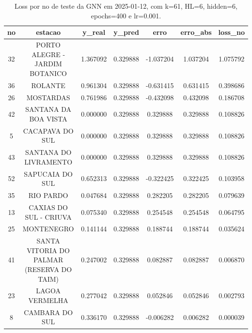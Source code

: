 \begin{table}[h]
\centering
\caption{Loss por no de teste da GNN em 2025-01-12, com k=61, HL=6, hidden=6, epochs=400 e lr=0.001.}
\label{tab:gnn_loss_k61_hl6_h6_e400_d20250112}
\begin{tabular}{ccccccc}
\toprule
no & estacao & y\_real & y\_pred & erro & erro\_abs & loss\_no \\
\midrule
32 & PORTO ALEGRE - JARDIM BOTANICO & 1.367092 & 0.329888 & -1.037204 & 1.037204 & 1.075792 \\
36 & ROLANTE & 0.961304 & 0.329888 & -0.631415 & 0.631415 & 0.398686 \\
26 & MOSTARDAS & 0.761986 & 0.329888 & -0.432098 & 0.432098 & 0.186708 \\
42 & SANTANA DA BOA VISTA & 0.000000 & 0.329888 & 0.329888 & 0.329888 & 0.108826 \\
5 & CACAPAVA DO SUL & 0.000000 & 0.329888 & 0.329888 & 0.329888 & 0.108826 \\
43 & SANTANA DO LIVRAMENTO & 0.000000 & 0.329888 & 0.329888 & 0.329888 & 0.108826 \\
52 & SAPUCAIA DO SUL & 0.652313 & 0.329888 & -0.322425 & 0.322425 & 0.103958 \\
35 & RIO PARDO & 0.047684 & 0.329888 & 0.282205 & 0.282205 & 0.079639 \\
13 & CAXIAS DO SUL - CRIUVA & 0.075340 & 0.329888 & 0.254548 & 0.254548 & 0.064795 \\
25 & MONTENEGRO & 0.141144 & 0.329888 & 0.188744 & 0.188744 & 0.035624 \\
41 & SANTA VITORIA DO PALMAR (RESERVA DO TAIM) & 0.247002 & 0.329888 & 0.082887 & 0.082887 & 0.006870 \\
23 & LAGOA VERMELHA & 0.277042 & 0.329888 & 0.052846 & 0.052846 & 0.002793 \\
8 & CAMBARA DO SUL & 0.336170 & 0.329888 & -0.006282 & 0.006282 & 0.000039 \\
\bottomrule
\end{tabular}
\end{table}
